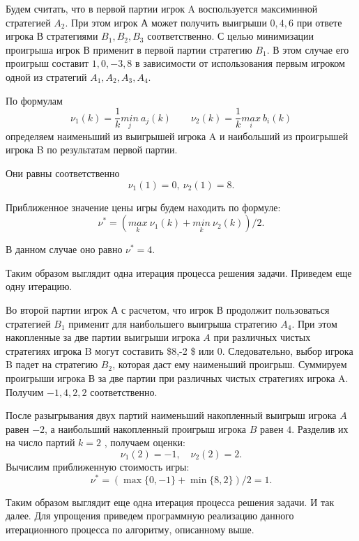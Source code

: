 \documentclass[11pt]{article}
\begin{document}
    Будем считать, что в первой партии игрок A воспользуется максиминной
стратегией \(A_2\). При этом игрок А может получить выигрыши \(0,4,6\)
при ответе игрока В стратегиями \(B_1, B_2, B_3\) соответственно. С
целью минимизации проигрыша игрок В применит в первой партии стратегию
\(B_1\). В этом случае его проигрыш составит \(1, 0, -3, 8\) в
зависимости от использования первым игроком одной из стратегий
\(A_1, A_2, A_3, A_4\).

По формулам
\[\nu_1(k)=\frac{1}{k}\underset{j}{min}\ a_j(k) \quad \quad \nu_2(k)=\frac{1}{k}\underset{i}{max}\ b_i(k)\]
определяем наименьший из выигрышей игрока A и наибольший из проигрышей
игрока B по результатам первой партии.

Они равны соответственно \[\nu_1(1)=0, \ \nu_2(1)=8.\]

Приближенное значение цены игры будем находить по формуле:
\[\nu^*=(\underset{k}{max}\ \nu_1(k) + \underset{k}{min}\ \nu_2(k))/2.\]

В данном случае оно равно \(\nu^* = 4\).

Таким образом выглядит одна итерация процесса решения задачи. Приведем
еще одну итерацию.

Во второй партии игрок А с расчетом, что игрок В продолжит пользоваться
стратегией \(B_1\) применит для наибольшего выигрыша стратегию \(A_4\).
При этом накопленные за две партии выигрыши игрока \(A\) при различных
чистых стратегиях игрока B могут составить \$8,-2 \$ или \(0\).
Следовательно, выбор игрока B падет на стратегию \(B_2\), которая даст
ему наименьший проигрыш. Суммируем проигрыши игрока В за две партии при
различных чистых стратегиях игрока A. Получим \(-1,4,2,2\)
соответственно.

После разыгрывания двух партий наименьший накопленный выигрыш игрока
\(A\) равен \(-2\), а наибольший накопленный проигрыш игрока \(B\) равен
\(4\). Разделив их на число партий \(k = 2\) , получаем оценки:
\[\nu_1(2)=-1,\quad \nu_2(2)=2.\] Вычислим приближенную стоимость игры:
\[\nu^*=(\max\{0,-1\}+\min\{8, 2\})/2=1.\]

Таким образом выглядит еще одна итерация процесса решения задачи. И так
далее. Для упрощения приведем программную реализацию данного
итерационного процесса по алгоритму, описанному выше.
\end{document}

